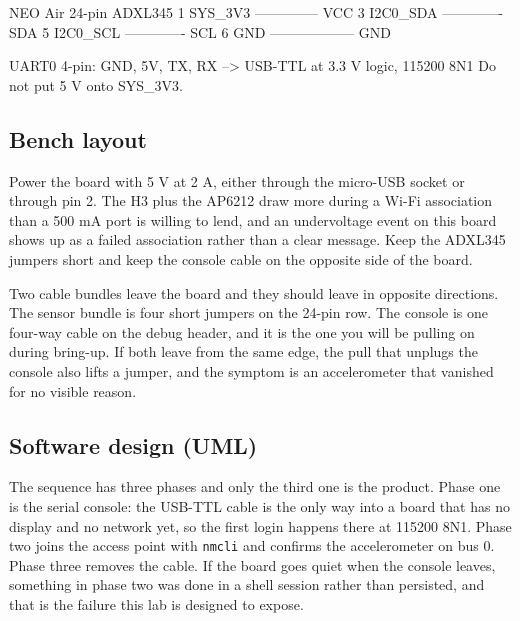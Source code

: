 \begin{asciiart}
NEO Air 24-pin            ADXL345
1  SYS_3V3 -------------- VCC
3  I2C0_SDA ------------- SDA
5  I2C0_SCL ------------- SCL
6  GND ------------------ GND

UART0 4-pin: GND, 5V, TX, RX --> USB-TTL at 3.3 V logic, 115200 8N1
Do not put 5 V onto SYS_3V3.
\end{asciiart}

\subsection*{Bench layout}


Power the board with 5 V at 2 A, either through the micro-USB socket or through pin 2. The H3 plus the AP6212 draw more during a Wi-Fi association than a 500 mA port is willing to lend, and an undervoltage event on this board shows up as a failed association rather than a clear message. Keep the ADXL345 jumpers short and keep the console cable on the opposite side of the board.

Two cable bundles leave the board and they should leave in opposite directions. The sensor bundle is four short jumpers on the 24-pin row. The console is one four-way cable on the debug header, and it is the one you will be pulling on during bring-up. If both leave from the same edge, the pull that unplugs the console also lifts a jumper, and the symptom is an accelerometer that vanished for no visible reason.

\subsection*{Software design (UML)}


The sequence has three phases and only the third one is the product. Phase one is the serial console: the USB-TTL cable is the only way into a board that has no display and no network yet, so the first login happens there at 115200 8N1. Phase two joins the access point with \texttt{nmcli} and confirms the accelerometer on bus 0. Phase three removes the cable. If the board goes quiet when the console leaves, something in phase two was done in a shell session rather than persisted, and that is the failure this lab is designed to expose.

